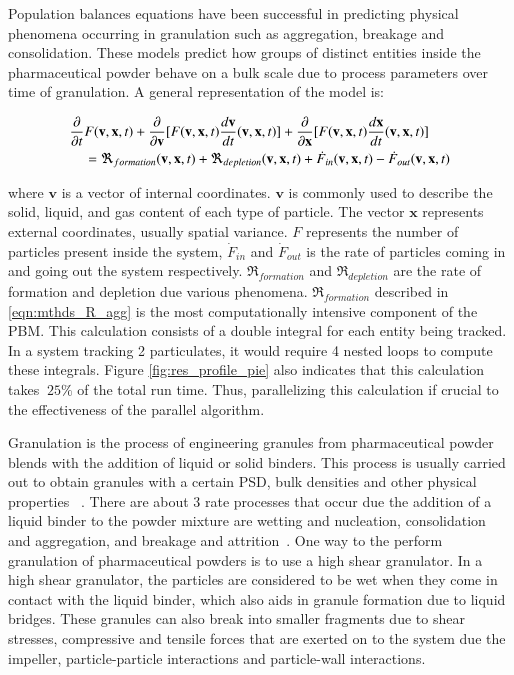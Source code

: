 \documentclass[preprint,10pt,authoryear,review]{elsarticle}
\begin{document}
Population balances equations have been successful in 
predicting physical phenomena occurring in granulation such as aggregation, breakage and 
consolidation. These models predict how groups of distinct entities inside the pharmaceutical 
powder behave on a bulk scale due to process parameters over time of granulation. A
general representation of the model is:

\begin{align}
\frac{ \partial}{\partial t}&F(\textbf{v},\textbf{x},t) + \frac{\partial}{\partial 
\textbf{v}}[F(\textbf{v},\textbf{x},t)\frac{d\textbf{v}}{dt}(\textbf{v},\textbf{x},t)] 
+ \frac{\partial}{\partial \textbf{x}}[F(\textbf{v},\textbf{x},t)\frac{d\textbf{x}}{dt}
(\textbf{v},\textbf{x},t)] \notag\\
    &= 
\Re_{formation}(\textbf{v},\textbf{x},t)+\Re_{depletion}(\textbf{v},\textbf{x},t)
+\dot{F}_{in}(\textbf{v},\textbf{x},t) -\dot{F}_{out}(\textbf{v},\textbf{x},t) 
\label{eqn:bkgd_pbm_general} 
\end{align}

where $\textbf{v}$ is a vector of internal 
coordinates.  $\textbf{v}$ is commonly used to describe the solid, liquid, 
and gas content of each type of particle. The vector $\textbf{x}$ represents 
external coordinates, usually spatial variance. $F$ represents the 
number of particles present inside the system, $\dot{F}_{in}$ 
and $\dot{F}_{out}$ is the rate of particles coming in and going out the 
system respectively. $\Re_{formation}$ and $\Re_{depletion}$ are the rate of 
formation and depletion due various phenomena. $\Re_{formation}$ described in 
\ref{eqn:mthds_R_agg} is the most computationally intensive component of the PBM.
This calculation consists of a double integral for each entity being tracked. In a 
system tracking 2 particulates, it would require 4 nested loops to compute these 
integrals. Figure \ref{fig:res_profile_pie} also indicates that this calculation 
takes $~25\%$ of the total run time. Thus, parallelizing this calculation if crucial 
to the effectiveness of the parallel algorithm.

Granulation is the process of engineering granules from pharmaceutical powder blends 
with the addition of liquid or solid binders. This process is usually carried out 
to obtain granules with a certain PSD,  bulk densities and other physical properties
~\citep{Barrasso2015cerd}. There are about 3 rate processes that occur due the addition 
of a liquid binder to the powder mixture are wetting and nucleation, consolidation and 
aggregation, and breakage and attrition~\citep{sen2014}. One way to the perform 
granulation of pharmaceutical powders is to use a high shear granulator. 
In a high shear granulator, the particles are considered to be wet 
when they come in contact with the liquid binder, which also aids in granule formation due to 
liquid bridges. These granules can also break into smaller fragments due to shear stresses, 
compressive and tensile forces that are exerted on to the system due the impeller, 
particle-particle interactions and particle-wall interactions.
\end{document}

